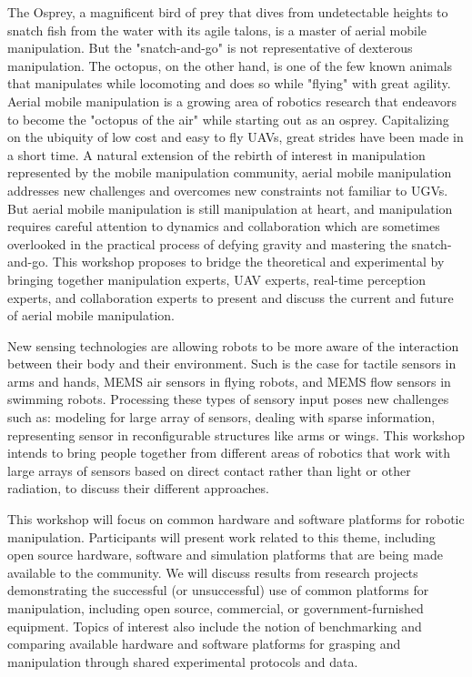 \begin{spacing}{1.0}
{
The Osprey, a magnificent bird of prey that dives from undetectable heights to snatch fish from the water with its agile talons, is a master of aerial mobile manipulation. But the "snatch-and-go" is not representative of dexterous manipulation. The octopus, on the other hand, is one of the few known animals that manipulates while locomoting and does so while "flying" with great agility. Aerial mobile manipulation is a growing area of robotics research that endeavors to become the "octopus of the air" while starting out as an osprey. Capitalizing on the ubiquity of low cost and easy to fly UAVs, great strides have been made in a short time. A natural extension of the rebirth of interest in manipulation represented by the mobile manipulation community, aerial mobile manipulation addresses new challenges and overcomes new constraints not familiar to UGVs. But aerial mobile manipulation is still manipulation at heart, and manipulation requires careful attention to dynamics and collaboration which are sometimes overlooked in the practical process of defying gravity and mastering the snatch-and-go. This workshop proposes to bridge the theoretical and experimental by bringing together manipulation experts, UAV experts, real-time perception experts, and collaboration experts to present and discuss the current and future of aerial mobile manipulation.
}

{
New sensing technologies are allowing robots to be more aware of the interaction between their body and their environment. Such is the case for tactile sensors in arms and hands, MEMS air sensors in flying robots, and MEMS flow sensors in swimming robots. Processing these types of sensory input poses new challenges such as: modeling for large array of sensors, dealing with sparse information, representing sensor in reconfigurable structures like arms or wings. This workshop intends to bring people together from different areas of robotics that work with large
arrays of sensors based on direct contact rather than light or other radiation, to discuss their different approaches.
}




{
This workshop will focus on common hardware and software platforms for robotic manipulation. Participants will present work related to this theme, including open source hardware, software and simulation platforms that are being made available to the community. We will discuss results from research projects demonstrating the successful (or unsuccessful) use of common platforms for manipulation, including open source, commercial, or government-furnished equipment. Topics of interest also include the notion of benchmarking and comparing available hardware and software platforms for grasping and manipulation through shared experimental protocols and data.

}
\end{spacing}
